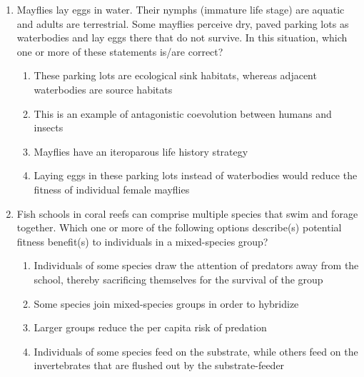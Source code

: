 \documentclass[journal]{IEEEtran}
\begin{document}
\begin{enumerate}
\begin{multicols}{2}
    \begin{enumerate}
        \item P-iii; Q-ii; R-i;
S-v
        \item P-ii; Q-iii; R-i;
S-iv
        \item P-ii; Q-iii; R-i;
S-v
        \item P-iii; Q-v; R-ii;
S-iv
    \end{enumerate}
    \end{multicols}

    \item Mayflies lay eggs in water.
Their nymphs (immature life stage) are aquatic and adults are terrestrial.
Some mayflies perceive dry, paved parking lots as waterbodies and lay eggs there that do not survive.
In this situation, which one or more of these statements is/are correct?
\begin{enumerate}
        \item These parking lots are ecological sink habitats, whereas adjacent waterbodies are source habitats
        \item This is an example of antagonistic coevolution between humans and insects
        \item Mayflies have an iteroparous life history strategy
        \item Laying eggs in these parking lots instead of waterbodies would reduce the fitness of individual female mayflies
    \end{enumerate}

    \item Fish schools in coral reefs can comprise multiple species that swim 
and forage together. Which one or more of the following options describe(s) potential fitness benefit(s) to individuals in a mixed-species group?
\begin{enumerate}
        \item Individuals of some species draw the attention of predators away from the school, thereby sacrificing themselves for the survival of the group
        \item Some species join mixed-species groups in order to hybridize
        \item Larger groups reduce the per capita risk of predation
        \item Individuals of some species feed on the substrate, while others feed on the invertebrates that are flushed out by the substrate-feeder
    \end{enumerate}


\end{enumerate}
\end{document}

